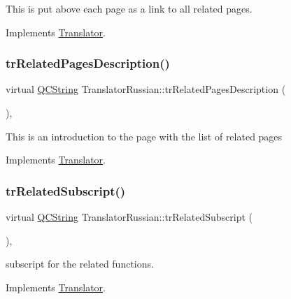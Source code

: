 This is put above each page as a link to all related pages. 

Implements \mbox{\hyperlink{class_translator}{Translator}}.

\mbox{\label{class_translator_russian_a797ec284841820dc79ee647fe644cd7d}} 
\subsubsection{\texorpdfstring{trRelatedPagesDescription()}{trRelatedPagesDescription()}}
{\footnotesize\ttfamily virtual \mbox{\hyperlink{class_q_c_string}{Q\+C\+String}} Translator\+Russian\+::tr\+Related\+Pages\+Description (\begin{DoxyParamCaption}{ }\end{DoxyParamCaption})\hspace{0.3cm}{\ttfamily [inline]}, {\ttfamily [virtual]}}

This is an introduction to the page with the list of related pages 

Implements \mbox{\hyperlink{class_translator}{Translator}}.

\mbox{\label{class_translator_russian_ab30ffe21c4305fed3e895e05382a3f95}} 
\subsubsection{\texorpdfstring{trRelatedSubscript()}{trRelatedSubscript()}}
{\footnotesize\ttfamily virtual \mbox{\hyperlink{class_q_c_string}{Q\+C\+String}} Translator\+Russian\+::tr\+Related\+Subscript (\begin{DoxyParamCaption}{ }\end{DoxyParamCaption})\hspace{0.3cm}{\ttfamily [inline]}, {\ttfamily [virtual]}}

subscript for the related functions. 

Implements \mbox{\hyperlink{class_translator}{Translator}}.

\mbox{\label{class_translator_russian_a3d1cd8d10fe1bbe3763151f5d2780e2b}} 
